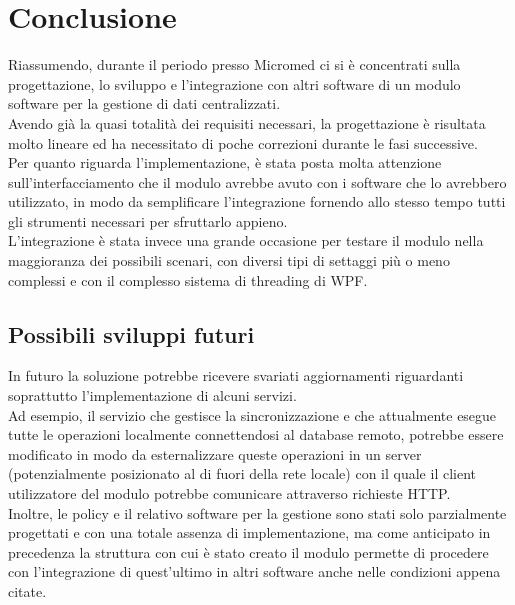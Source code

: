 \documentclass[\main/main.tex]{subfiles}
\begin{document}
\chapter*{Conclusione}

Riassumendo, durante il periodo presso Micromed ci si è concentrati sulla progettazione, lo sviluppo e l'integrazione con altri software di un modulo software per la gestione di dati centralizzati.\\
Avendo già la quasi totalità dei requisiti necessari, la progettazione è risultata molto lineare ed ha necessitato di poche correzioni durante le fasi successive.\\
Per quanto riguarda l'implementazione, è stata posta molta attenzione sull'interfacciamento che il modulo avrebbe avuto con i software che lo avrebbero utilizzato, in modo da semplificare l'integrazione fornendo allo stesso tempo tutti gli strumenti necessari per sfruttarlo appieno.\\
L'integrazione è stata invece una grande occasione per testare il modulo nella maggioranza dei possibili scenari, con diversi tipi di settaggi più o meno complessi e con il complesso sistema di threading di WPF.

\section{Possibili sviluppi futuri}
In futuro la soluzione potrebbe ricevere svariati aggiornamenti riguardanti soprattutto l'implementazione di alcuni servizi.\\
Ad esempio, il servizio che gestisce la sincronizzazione e che attualmente esegue tutte le operazioni localmente connettendosi al database remoto, potrebbe essere modificato in modo da esternalizzare queste operazioni in un server (potenzialmente posizionato al di fuori della rete locale) con il quale il client utilizzatore del modulo potrebbe comunicare attraverso richieste HTTP.\\
Inoltre, le policy e il relativo software per la gestione sono stati solo parzialmente progettati e con una totale assenza di implementazione, ma come anticipato in precedenza la struttura con cui è stato creato il modulo permette di procedere con l'integrazione di quest'ultimo in altri software anche nelle condizioni appena citate.\\
\end{document}
